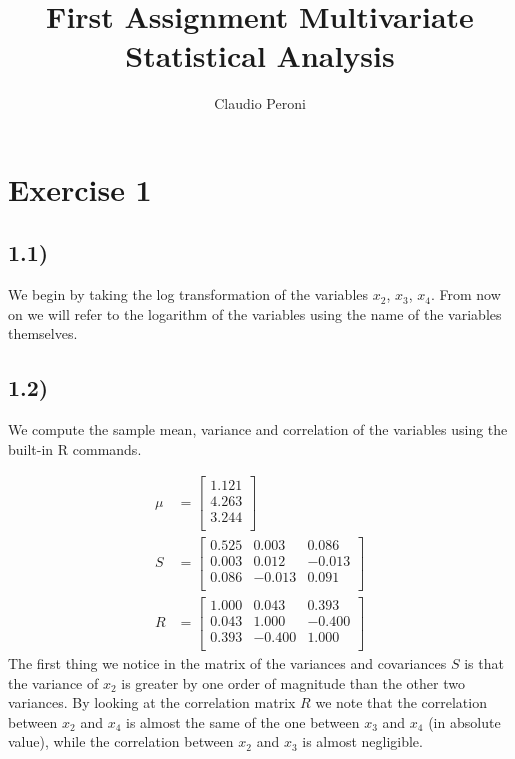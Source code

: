 \documentclass[a4paper,11pt,oneside]{report}
\title{First Assignment Multivariate Statistical Analysis}
\author{Claudio Peroni}
\date{}
\begin{document}
\maketitle

\section*{Exercise 1}
\subsection*{1.1)}
	We begin by taking the log transformation of the variables $x_2$, $x_3$, $x_4$.
	From now on we will refer to the logarithm of the variables using the name of the variables themselves.

\subsection*{1.2)}
	We compute the sample mean, variance and correlation of the variables using the built-in R commands.

	\begin{align}
	\mu &= 
	\begin{bmatrix}
	  1.121 \\ 
	  4.263 \\ 
	  3.244 \\ 
	   \end{bmatrix}\\
	S &=
	\begin{bmatrix}
	  0.525 & 0.003 & 0.086 \\ 
	  0.003 & 0.012 & -0.013 \\ 
	  0.086 & -0.013 & 0.091 \\ 
	   \end{bmatrix}\\
	R &= \begin{bmatrix}
	  1.000 & 0.043 & 0.393 \\ 
	  0.043 & 1.000 & -0.400 \\ 
	  0.393 & -0.400 & 1.000 \\ 
	   \end{bmatrix}
	\end{align}
	The first thing we notice in the matrix of the variances and covariances $S$ is that the variance of $x_2$ is greater by one order of magnitude than the other two variances.
	By looking at the correlation matrix $R$ we note that the correlation between $x_2$ and $x_4$ is almost the same of the one between $x_3$ and $x_4$ (in absolute value), while the correlation between $x_2$ and $x_3$ is almost negligible.
\end{document}

